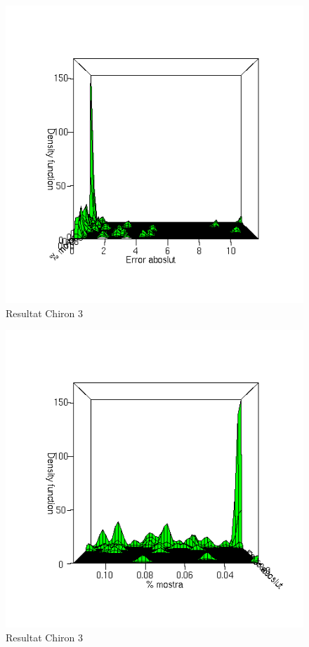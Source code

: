 	\begin{figure}[tbp]
		\begin{center}
			\includegraphics[scale=0.75]{chiron/rgrau3.png}
		\end{center}
		\caption{Resultat Chiron 3}
		\label{fig:resChir3}
	\end{figure}
	\begin{figure}[tbp]
		\begin{center}
			\includegraphics[scale=0.75]{chiron/rgrau4.png}
		\end{center}
		\caption{Resultat Chiron 3}
		\label{fig:resChir4}
	\end{figure}

